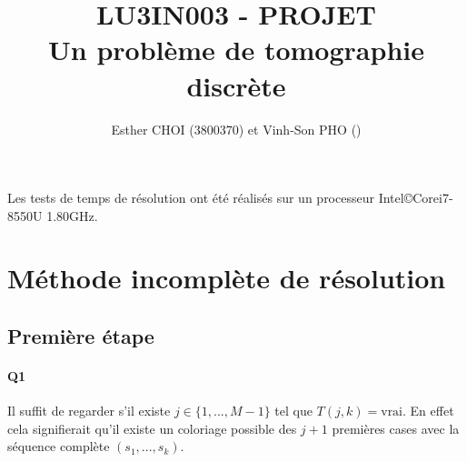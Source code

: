 \documentclass[12pt]{article}
\title{LU3IN003 - PROJET \\ Un problème de tomographie discrète\\}
\author{Esther CHOI (3800370) et Vinh-Son PHO ()}
\newcommand{\true}{\text{vrai}}
\begin{document}
	\maketitle
	\tableofcontents
	
	Les tests de temps de résolution ont été réalisés sur un processeur Intel\copyright Core\texttrademark i7-8550U 1.80GHz.
	
	\newpage
	
	
	\section{Méthode incomplète de résolution}
	
	\subsection{Première étape}
	
	\paragraph{Q1}
	Il suffit de regarder s'il existe $ j \in \{1,...,M-1\} $ tel que $ T(j,k) = \true $. En effet cela signifierait qu'il existe un coloriage possible des $ j+1 $ premières cases avec la séquence complète $ (s_1,...,s_k) $.
	
\end{document}
